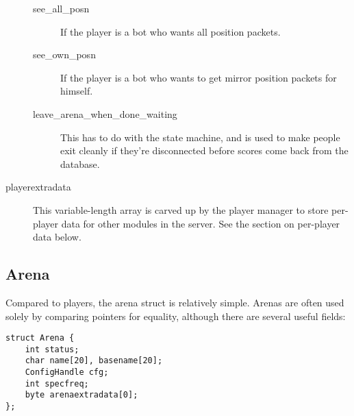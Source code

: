 \documentclass{article}
\begin{document}
\begin{description}
\begin{description}
\item[see\_all\_posn] If the player is a bot who wants all position
packets.

\item[see\_own\_posn] If the player is a bot who wants to get mirror
position packets for himself.

\item[leave\_arena\_when\_done\_waiting] This has to do with the state
machine, and is used to make people exit cleanly if they're disconnected
before scores come back from the database.

\end{description}

\item[playerextradata] This variable-length array is carved up by the
player manager to store per-player data for other modules in the server.
See the section on per-player data below.

\end{description}


\subsection{Arena}

Compared to players, the arena struct is relatively simple. Arenas are
often used solely by comparing pointers for equality, although there are
several useful fields:

\begin{verbatim}
struct Arena {
    int status;
    char name[20], basename[20];
    ConfigHandle cfg;
    int specfreq;
    byte arenaextradata[0];
};
\end{verbatim}
\end{document}
